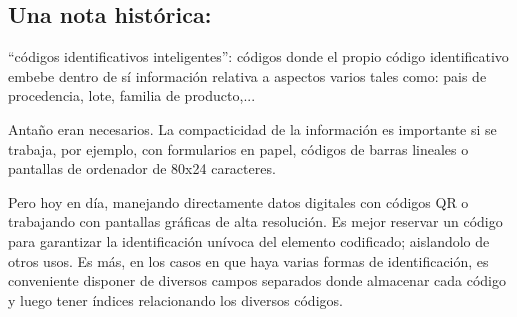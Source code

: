 \documentclass[spanish,12pt,a4paper,final,oneside]{book}
\begin{document}
\subsection{Una nota histórica:}
``códigos identificativos inteligentes'': códigos donde el propio código identificativo embebe dentro de sí información relativa a aspectos varios tales como: pais de procedencia, lote, familia de producto,...

Antaño eran necesarios.  La compacticidad de la información es importante si se trabaja, por ejemplo, con formularios en papel, códigos de barras lineales o pantallas de ordenador de 80x24 caracteres.

Pero hoy en día, manejando directamente datos digitales con códigos QR o trabajando con pantallas gráficas de alta resolución. Es mejor reservar un código para garantizar la identificación unívoca del elemento codificado; aislandolo de otros usos. Es más, en los casos en que haya varias formas de identificación, es conveniente disponer de diversos campos separados donde almacenar cada código y luego tener índices relacionando los diversos códigos.
\end{document}
